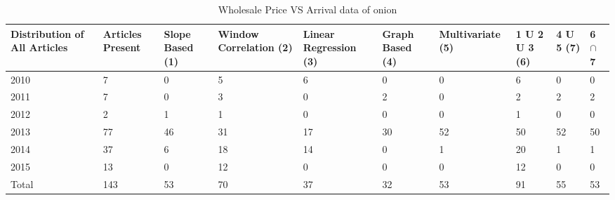 \documentclass[a4paper,10pt]{report}
\begin{document}
	\begin{table}[]
	\centering
	\resizebox{\textwidth}{!}
	{\begin{tabular}{|l|l|l|l|l|l|l|l|l|l|}
	\hline
	Distribution of All Articles & Articles Present & Slope Based (1) & Window Correlation (2) & Linear Regression (3) & Graph Based (4) & Multivariate (5) & 1 U 2 U 3 (6) & 4 U 5 (7) & 6  $\cap$ 7 \\
	\hline
	2010                         & 7                & 0           & 5           & 6                 & 0           & 0             & 6         & 0     & 0                                     \\
	\hline
	2011                         & 7                & 0           & 3           & 0                 & 2           & 0             & 2         & 2     & 2                                     \\
	\hline
	2012                         & 2                & 1           & 1           & 0                 & 0           & 0             & 1         & 0     & 0                                     \\
	\hline
	2013                         & 77               & 46          & 31          & 17                & 30          & 52            & 50        & 52    & 50                                    \\
	\hline
	2014                         & 37               & 6           & 18          & 14                & 0           & 1             & 20        & 1     & 1                                     \\
	\hline
	2015                         & 13               & 0           & 12          & 0                 & 0           & 0             & 12        & 0     & 0                                     \\
	\hline
	Total                        & 143              & 53          & 70          & 37                & 32          & 53            & 91        & 55    & 53                                   \\
	\hline
	\end{tabular}}	
	\caption{ Wholesale Price VS Arrival data of onion}
	\label{WholesaleVsArrival}
	\end{table}
	
	
	
\end{document}
